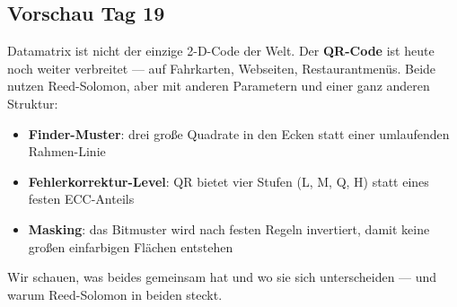\subsection*{Vorschau Tag 19}

Datamatrix ist nicht der einzige 2-D-Code der Welt. Der \textbf{QR-Code}
ist heute noch weiter verbreitet — auf Fahrkarten, Webseiten,
Restaurantmenüs. Beide nutzen Reed-Solomon, aber mit anderen Parametern
und einer ganz anderen Struktur:

\begin{itemize}
\item \textbf{Finder-Muster}: drei große Quadrate in den Ecken
  statt einer umlaufenden Rahmen-Linie
\item \textbf{Fehlerkorrektur-Level}: QR bietet vier Stufen (L, M, Q, H)
  statt eines festen ECC-Anteils
\item \textbf{Masking}: das Bitmuster wird nach festen Regeln
  invertiert, damit keine großen einfarbigen Flächen entstehen
\end{itemize}

Wir schauen, was beides gemeinsam hat und wo sie sich unterscheiden —
und warum Reed-Solomon in beiden steckt.
